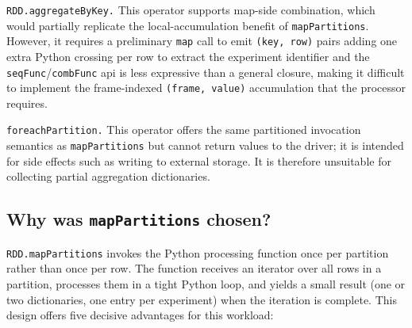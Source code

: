 \texttt{RDD.aggregateByKey.} This operator supports map-side combination, which
would partially replicate the local-accumulation benefit of \texttt{mapPartitions}.  However,
it requires a preliminary \texttt{map} call to emit \texttt{(key, row)} pairs adding one
extra Python crossing per row to extract the experiment identifier and the
\texttt{seqFunc}/\texttt{combFunc} \gls{api} is less expressive than a general closure,
making it difficult to implement the frame-indexed \texttt{(frame, value)} accumulation that
the processor requires.

\texttt{foreachPartition.} This operator offers the same partitioned invocation
semantics as \texttt{mapPartitions} but cannot return values to the driver; it is intended for
side effects such as writing to external storage.  It is therefore unsuitable for collecting
partial aggregation dictionaries.

\subsection{Why was \texttt{mapPartitions} chosen?}
\label{subsec:cap4-why-was-mappartitions-chosen}

\texttt{RDD.mapPartitions} invokes the Python processing function once per partition
rather than once per row.  The function receives an iterator over all rows in a partition,
processes them in a tight Python loop, and yields a small result (one or two dictionaries,
one entry per experiment) when the iteration is complete.  This design offers five decisive
advantages for this workload:

